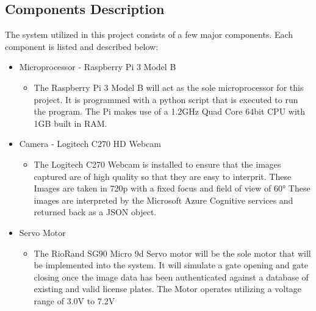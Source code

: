 \documentclass[a4paper,12pt]{article}
\begin{document}
\newpage
\subsection{Components Description}
The system utilized in this project consists of a few major components. Each component is listed and described below:
\begin{itemize}
\item Microprocessor - Raspberry Pi 3 Model B
\begin{itemize}
    \item The Raspberry Pi 3 Model B will act as the sole microprocessor for this project. It is programmed with a python script that is executed to run the program. The Pi makes use of  a 1.2GHz Quad Core 64bit CPU with 1GB built in RAM.
\end{itemize} 
\item Camera - Logitech C270 HD Webcam
\begin{itemize}
    \item The Logitech C270 Webcam is installed to ensure that the images captured are of high quality so that they are easy to interprit. These Images are taken in 720p with a fixed focus and field of view of \ang{60} These images are interpreted by the Microsoft Azure Cognitive services and returned back as a JSON object.
\end{itemize}
\item Servo Motor
\begin{itemize}
    \item The RioRand SG90 Micro 9d Servo motor will be the sole motor that will be implemented into the system. It will simulate a gate opening and gate closing once the image data has been authenticated against a database of existing and valid license plates. The Motor operates utilizing a voltage range of 3.0V to 7.2V
\end{itemize}
\end{itemize}
\end{document}

